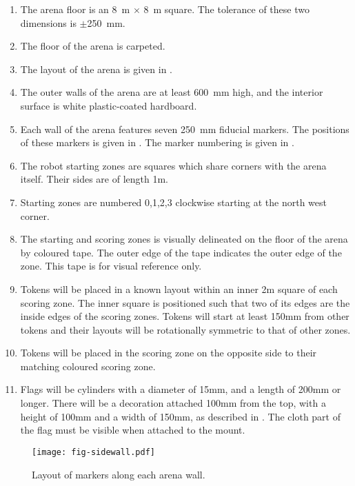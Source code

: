 \begin{enumerate}
  \item The arena floor is an \SI{8}{m} $\times$ \SI{8}{m} square. The tolerance
        of these two dimensions is $\pm$\SI{250}{mm}.
  \item The floor of the arena is carpeted.
  \item The layout of the arena is given in .
  \item The outer walls of the arena are at least \SI{600}{mm} high, and the
        interior surface is white plastic-coated hardboard.
  \item Each wall of the arena features seven \SI{250}{mm} fiducial markers.
        The positions of these markers is given in .
        The marker numbering is given in .
  \item The robot starting zones are squares which share corners with the arena
        itself. Their sides are of length \si{1}{m}.
  \item Starting zones are numbered 0,1,2,3 clockwise starting at the north west corner.
  \item The starting and scoring zones is visually delineated on the floor of
        the arena by coloured tape. The outer edge of the tape indicates the
        outer edge of the zone. This tape is for visual reference only.
  \item \label{spec:tokenpos} Tokens will be placed in a known layout
        within an inner \si{2}{m} square of each scoring zone. The inner square
        is positioned such that two of its edges are the inside edges of the
        scoring zones. Tokens will start at least \si{150}{mm} from other tokens
        and their layouts will be rotationally symmetric to that of other zones.
  \item Tokens will be placed in the scoring zone on the opposite side to their
        matching coloured scoring zone.
  \item \label{spec:flags} Flags will be cylinders with a diameter
        of \si{15}{mm}, and a length of \si{200}{mm} or longer. There will be
        a decoration attached \si{100}{mm} from the top, with a height of \si{100}{mm}
        and a width of \si{150}{mm}, as described in . The
        cloth part of the flag must be visible when attached to the mount.

\end{enumerate}

\begin{sidewaysfigure}
  \texttt{[image: fig-sidewall.pdf]}
  \caption{Layout of markers along each arena wall.}
  \label{fig:sidewall}
\end{sidewaysfigure}

